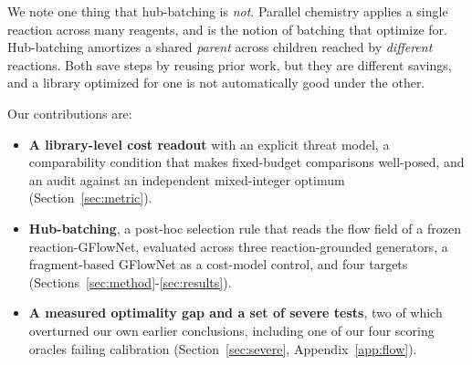 \documentclass{article}
\begin{document}
We note one thing that hub-batching is \emph{not}. Parallel chemistry applies a single
reaction across many reagents, and is the notion of batching that \citet{fromer2025diversity} optimize for. Hub-batching amortizes a shared \emph{parent}
across children reached by \emph{different} reactions. Both save steps by reusing prior
work, but they are different savings, and a library optimized for one is not automatically good under the other.

Our contributions are:
\begin{itemize}
\itemsep0.15em
\item \textbf{A library-level cost readout} with an explicit threat model, a comparability
      condition that makes fixed-budget comparisons well-posed, and an audit against an
      independent mixed-integer optimum (Section~\ref{sec:metric}).
\item \textbf{Hub-batching}, a post-hoc selection rule that reads the flow field of a
      frozen reaction-GFlowNet, evaluated across three reaction-grounded generators, a
      fragment-based GFlowNet as a cost-model control, and four targets
      (Sections~\ref{sec:method}-\ref{sec:results}).
\item \textbf{A measured optimality gap and a set of severe tests}, two of which
      overturned our own earlier conclusions, including one of our four scoring oracles
      failing calibration (Section~\ref{sec:severe}, Appendix~\ref{app:flow}).
\end{itemize}
\end{document}
